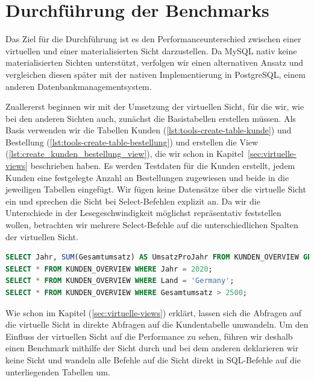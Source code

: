 \section{Durchführung der Benchmarks}\label{sec:durchfuhrung-der-benchmarks}

Das Ziel für die Durchführung ist es den Performanceunterschied zwischen einer virtuellen und einer materialisierten Sicht darzustellen.
Da MySQL nativ keine materialisierten Sichten unterstützt, verfolgen wir einen alternativen Ansatz und vergleichen diesen später mit der nativen Implementierung in PostgreSQL, einem anderen Datenbankmanagementsystem.

Zuallererst beginnen wir mit der Umsetzung der virtuellen Sicht, für die wir, wie bei den anderen Sichten auch, zunächst die Basistabellen erstellen müssen.
Als Basis verwenden wir die Tabellen Kunden (\ref{lst:tools-create-table-kunde}) und Bestellung (\ref{lst:tools-create-table-bestellung}) und erstellen die View (\ref{lst:create_kunden_bestellung_view}), die wir schon in Kapitel~\ref{sec:virtuelle-views} beschrieben haben.
Es werden Testdaten für die Kunden erstellt, jedem Kunden eine festgelegte Anzahl an Bestellungen zugewiesen und beide in die jeweiligen Tabellen eingefügt.
Wir fügen keine Datensätze über die virtuelle Sicht ein und sprechen die Sicht bei Select-Befehlen explizit an.
Da wir die Unterschiede in der Lesegeschwindigkeit möglichst repräsentativ feststellen wollen, betrachten wir mehrere Select-Befehle auf die unterschiedlichen Spalten der virtuellen Sicht.

\vspace{-5pt}
\begin{lstlisting}[language=SQL,caption=Select-Abfragen auf alle Spalten der View,label={lst:view-select-query}]
SELECT Jahr, SUM(Gesamtumsatz) AS UmsatzProJahr FROM KUNDEN_OVERVIEW GROUP BY Jahr;
SELECT * FROM KUNDEN_OVERVIEW WHERE Jahr = 2020;
SELECT * FROM KUNDEN_OVERVIEW WHERE Land = 'Germany';
SELECT * FROM KUNDEN_OVERVIEW WHERE Gesamtumsatz > 2500;
\end{lstlisting}
\vspace{-5pt}

Wie schon im Kapitel (\ref{sec:virtuelle-views}) erklärt, lassen sich die Abfragen auf die virtuelle Sicht in direkte Abfragen auf die Kundentabelle umwandeln.
Um den Einfluss der virtuellen Sicht auf die Performance zu sehen, führen wir deshalb einen Benchmark mithilfe der Sicht durch und bei dem anderen deklarieren wir keine Sicht und wandeln alle Befehle auf die Sicht direkt in SQL-Befehle auf die unterliegenden Tabellen um.

